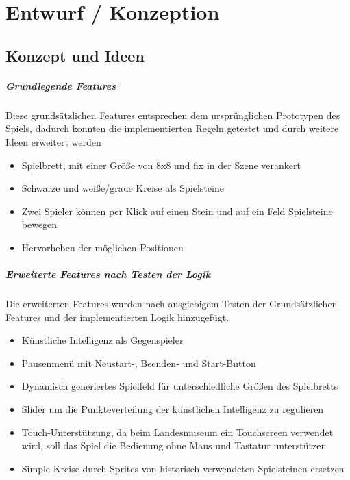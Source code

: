 
\chapter{Entwurf / Konzeption}
\label{ch:Entwurf}



\section{Konzept und Ideen}
\label{ch:Entwurf:sec:1.Konzept}
\paragraph{Grundlegende Features}
 Diese grundsätzlichen Features entsprechen dem ursprünglichen Prototypen des Spiels, dadurch konnten die implementierten Regeln getestet und durch weitere Ideen erweitert werden
 	\begin{itemize}
 		\item Spielbrett, mit einer Größe von 8x8 und fix in der Szene verankert
 		\item Schwarze und weiße/graue Kreise als Spielsteine
 		\item Zwei Spieler können per Klick auf einen Stein und auf ein Feld Spielsteine bewegen
 		\item Hervorheben der möglichen Positionen
 	\end{itemize}

 \paragraph{Erweiterte Features nach Testen der Logik}
 Die erweiterten Features wurden nach ausgiebigem Testen der Grundsätzlichen Features und der implementierten Logik hinzugefügt.
 \begin{itemize}
 \item Künstliche Intelligenz als Gegenspieler
 \item Pausenmenü mit Neustart-, Beenden- und Start-Button
 \item Dynamisch generiertes Spielfeld für unterschiedliche Größen des Spielbretts
 \item Slider um die Punkteverteilung der künstlichen Intelligenz zu regulieren
 \item Touch-Unterstützung, da beim Landesmuseum ein Touchscreen verwendet wird, soll das Spiel die Bedienung ohne Maus und Tastatur unterstützen
 \item Simple Kreise durch Sprites von historisch verwendeten Spielsteinen ersetzen
\end{itemize}


